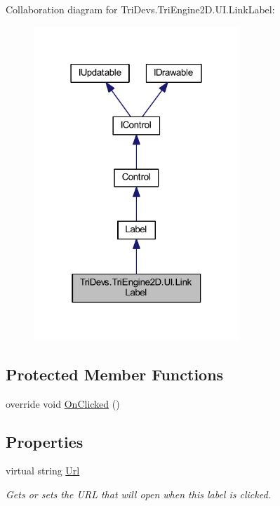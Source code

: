 Collaboration diagram for Tri\-Devs.\-Tri\-Engine2\-D.\-U\-I.\-Link\-Label\-:\nopagebreak
\begin{figure}[H]
\begin{center}
\leavevmode
\includegraphics[width=219pt]{class_tri_devs_1_1_tri_engine2_d_1_1_u_i_1_1_link_label__coll__graph}
\end{center}
\end{figure}
\subsection*{Protected Member Functions}
\begin{DoxyCompactItemize}
\item 
override void \hyperlink{class_tri_devs_1_1_tri_engine2_d_1_1_u_i_1_1_link_label_adcc511e03ec0c880cdff37947178a756}{On\-Clicked} ()
\end{DoxyCompactItemize}
\subsection*{Properties}
\begin{DoxyCompactItemize}
\item 
virtual string \hyperlink{class_tri_devs_1_1_tri_engine2_d_1_1_u_i_1_1_link_label_a6a4b37c0c7d9910451a8444dfb9853a2}{Url}
\begin{DoxyCompactList}\small\item\em Gets or sets the U\-R\-L that will open when this label is clicked. \end{DoxyCompactList}\end{DoxyCompactItemize}

